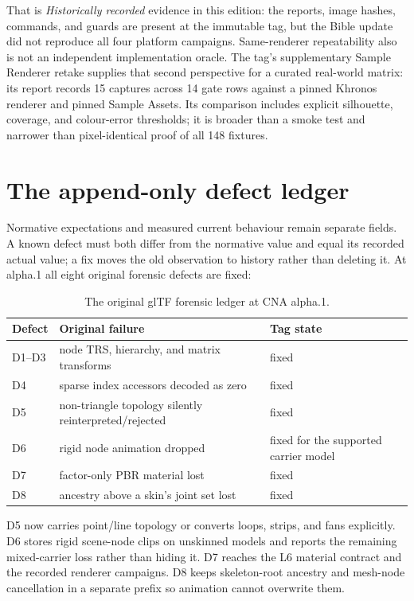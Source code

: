 That is \emph{Historically recorded} evidence in this edition: the reports, image hashes,
commands, and guards are present at the immutable tag, but the Bible update did not reproduce all
four platform campaigns. Same-renderer repeatability also is not an independent implementation
oracle. The tag's supplementary Sample Renderer retake supplies that second perspective for a
curated real-world matrix: its report records 15 captures across 14 gate rows against a pinned
Khronos renderer and pinned Sample Assets. Its comparison includes explicit silhouette,
coverage, and colour-error thresholds; it is broader than a smoke test and narrower than
pixel-identical proof of all 148 fixtures.

\section{The append-only defect ledger}

Normative expectations and measured current behaviour remain separate fields. A known defect
must both differ from the normative value and equal its recorded actual value; a fix moves the
old observation to history rather than deleting it. At alpha.1 all eight original forensic
defects are fixed:

\begin{table}[htbp]
\centering
\small
\begin{tabularx}{\textwidth}{@{}lXl@{}}
\toprule
Defect & Original failure & Tag state \\
\midrule
D1--D3 & node TRS, hierarchy, and matrix transforms & fixed \\
D4 & sparse index accessors decoded as zero & fixed \\
D5 & non-triangle topology silently reinterpreted/rejected & fixed \\
D6 & rigid node animation dropped & fixed for the supported carrier model \\
D7 & factor-only PBR material lost & fixed \\
D8 & ancestry above a skin's joint set lost & fixed \\
\bottomrule
\end{tabularx}
\caption{The original glTF forensic ledger at CNA alpha.1.}
\end{table}

D5 now carries point/line topology or converts loops, strips, and fans explicitly. D6 stores
rigid scene-node clips on unskinned models and reports the remaining mixed-carrier loss rather
than hiding it. D7 reaches the L6 material contract and the recorded renderer campaigns. D8
keeps skeleton-root ancestry and mesh-node cancellation in a separate prefix so animation cannot
overwrite them.

